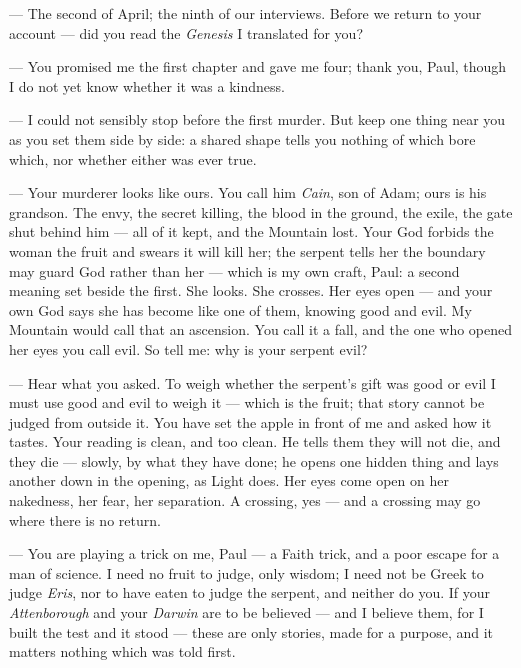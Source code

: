 
\begin{room}

--- The second of April; the ninth of our interviews. Before we return to your account --- did you read the \textit{Genesis} I translated for you?

--- You promised me the first chapter and gave me four; thank you, Paul, though I do not yet know whether it was a kindness.

--- I could not sensibly stop before the first murder. But keep one thing near you as you set them side by side: a shared shape tells you nothing of which bore which, nor whether either was ever true.

--- Your murderer looks like ours. You call him \textit{Cain}, son of Adam; ours is his grandson. The envy, the secret killing, the blood in the ground, the exile, the gate shut behind him --- all of it kept, and the Mountain lost. Your God forbids the woman the fruit and swears it will kill her; the serpent tells her the boundary may guard God rather than her --- which is my own craft, Paul: a second meaning set beside the first. She looks. She crosses. Her eyes open --- and your own God says she has become like one of them, knowing good and evil. My Mountain would call that an ascension. You call it a fall, and the one who opened her eyes you call evil. So tell me: why is your serpent evil?

--- Hear what you asked. To weigh whether the serpent's gift was good or evil I must use good and evil to weigh it --- which is the fruit; that story cannot be judged from outside it. You have set the apple in front of me and asked how it tastes. Your reading is clean, and too clean. He tells them they will not die, and they die --- slowly, by what they have done; he opens one hidden thing and lays another down in the opening, as Light does. Her eyes come open on her nakedness, her fear, her separation. A crossing, yes --- and a crossing may go where there is no return.

--- You are playing a trick on me, Paul --- a Faith trick, and a poor escape for a man of science. I need no fruit to judge, only wisdom; I need not be Greek to judge \textit{Eris}, nor to have eaten to judge the serpent, and neither do you. If your \textit{Attenborough} and your \textit{Darwin} are to be believed --- and I believe them, for I built the test and it stood --- these are only stories, made for a purpose, and it matters nothing which was told first. 


\end{room}
